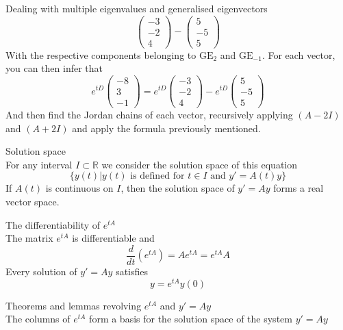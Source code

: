 \documentclass[journal, letterpaper]{IEEEtran}
\begin{document}
\begin{myboxg}{Dealing with multiple eigenvalues and generalised eigenvectors}
$$\begin{pmatrix}
            -3 \\ -2 \\ 4
        \end{pmatrix} - \begin{pmatrix}
            5 \\ -5 \\ 5
        \end{pmatrix}$$
        With the respective components belonging to $\text{GE}_2$ and $\text{GE}_{-1}$. For each vector, you can then infer that
        $$ e^{tD}\begin{pmatrix}
            -8 \\ 3 \\ -1
        \end{pmatrix} = e^{tD} \begin{pmatrix}
            -3 \\ -2 \\ 4
        \end{pmatrix} - e^{tD} \begin{pmatrix}
            5 \\ -5 \\ 5
        \end{pmatrix}$$
        And then find the Jordan chains of each vector, recursively applying $(A - 2I)$ and $(A + 2I)$ and apply the formula previously mentioned.
    \end{myboxg}
    \newpage
    \begin{mybox}{Solution space} \\
        For any interval $I \subset \mathbb{R}$ we consider the solution space of this equation
        $$ \{y(t) | y(t) \text{ is defined for } t \in I \text{ and } y' = A(t)y \}$$
        If $A(t)$ is continuous on $I$, then the solution space of $y' = Ay$ forms a real vector space.
    \end{mybox}
    \begin{myboxr}{The differentiability of $e^{tA}$} \\ 
        The matrix $e^{tA}$ is differentiable and
        $$ \frac{d}{dt}(e^{tA}) = Ae^{tA} = e^{tA}A$$
        Every solution of $y' = Ay$ satisfies
        $$ y = e^{tA}y(0)$$
    \end{myboxr}
    \begin{myboxr}{Theorems and lemmas revolving $e^{tA}$ and $y' = Ay$} \\ 
        The columns of $e^{tA}$ form a basis for the solution space of the system $y' = Ay$
    \end{myboxr}
\end{document}
